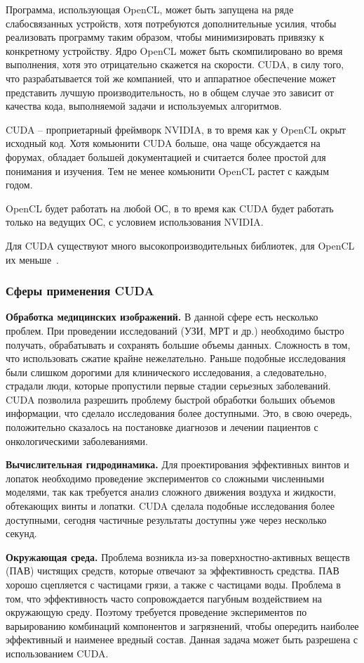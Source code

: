 Программа, использующая OpenCL, может быть запущена на ряде слабосвязанных устройств, хотя потребуются дополнительные усилия, чтобы реализовать программу таким образом, чтобы минимизировать привязку к конкретному устройству. Ядро OpenCL может быть скомпилировано во время выполнения, хотя это отрицательно скажется на скорости. CUDA, в силу того, что разрабатывается той же компанией, что и аппаратное обеспечение может представить лучшую производительность, но в общем случае это зависит от качества кода, выполняемой задачи и используемых алгоритмов.

CUDA -- проприетарный фреймворк NVIDIA, в то время как у OpenCL окрыт исходный код. Хотя комьюнити CUDA больше, она чаще обсуждается на форумах, обладает большей документацией и считается более простой для понимания и изучения. Тем не менее комьюнити OpenCL растет с каждым годом.

OpenCL будет работать на любой ОС, в то время как CUDA будет работать только на ведущих ОС, с условием использования NVIDIA.

Для CUDA существуют много высокопроизводительных библиотек, для OpenCL их меньше~\cite{Krasnov2002}.

\subsubsection*{Сферы применения CUDA}
\textbf{Обработка медицинских изображений.} В данной сфере есть несколько проблем. При проведении исследований (УЗИ, МРТ и др.) необходимо быстро получать, обрабатывать и сохранять большие объемы данных. Сложность в том, что использовать сжатие крайне нежелательно. Раньше подобные исследования были слишком дорогими для клинического исследования, а следовательно, страдали люди, которые пропустили первые стадии серьезных заболеваний. CUDA позволила разрешить проблему быстрой обработки больших объемов информации, что сделало исследования более доступными. Это, в свою очередь, положительно сказалось на постановке диагнозов и лечении пациентов с онкологическими заболеваниями.

\textbf{Вычислительная гидродинамика.} Для проектирования эффективных винтов и лопаток необходимо проведение экспериментов со сложными численными моделями, так как требуется анализ сложного движения воздуха и жидкости, обтекающих винты и лопатки. CUDA сделала подобные исследования более доступными, сегодня частичные результаты доступны уже через несколько секунд.

\textbf{Окружающая среда.} Проблема возникла из-за поверхностно-активных веществ (ПАВ) чистящих сре\-дств, которые отвечают за эффективность средства. ПАВ хорошо сцепляется с частицами грязи, а также с частицами воды. Проблема в том, что эффективность часто сопровождается пагубным воздействием на окружающую среду. Поэтому требуется проведение экспериментов по варьированию комбинаций компонентов и загрязнений, чтобы опередить наиболее эффективный и наименее вредный состав. Данная задача может быть разрешена с использованием CUDA.